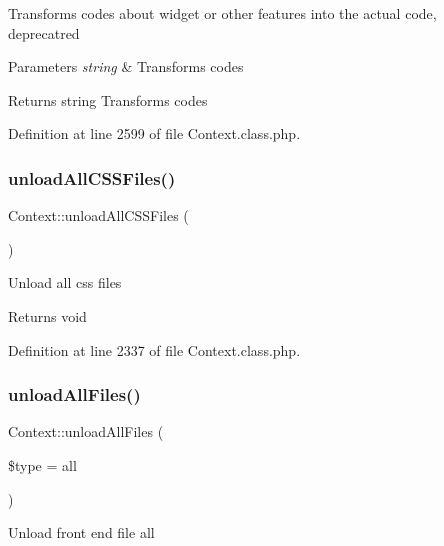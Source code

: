 Transforms codes about widget or other features into the actual code, deprecatred


\begin{DoxyParams}{Parameters}
{\em string} & Transforms codes \\
\hline
\end{DoxyParams}
\begin{DoxyReturn}{Returns}
string Transforms codes 
\end{DoxyReturn}


Definition at line 2599 of file Context.\+class.\+php.

\mbox{\label{classContext_a9eb05677aeb2e95029a10919ffc6053f}} 
\subsubsection{\texorpdfstring{unload\+All\+C\+S\+S\+Files()}{unloadAllCSSFiles()}}
{\footnotesize\ttfamily Context\+::unload\+All\+C\+S\+S\+Files (\begin{DoxyParamCaption}{ }\end{DoxyParamCaption})}

Unload all css files

\begin{DoxyReturn}{Returns}
void 
\end{DoxyReturn}


Definition at line 2337 of file Context.\+class.\+php.

\mbox{\label{classContext_a9b73c566c20a2ea32cab8180957c4b6d}} 
\subsubsection{\texorpdfstring{unload\+All\+Files()}{unloadAllFiles()}}
{\footnotesize\ttfamily Context\+::unload\+All\+Files (\begin{DoxyParamCaption}\item[{}]{\$type = {\ttfamily \textquotesingle{}all\textquotesingle{}} }\end{DoxyParamCaption})}

Unload front end file all


